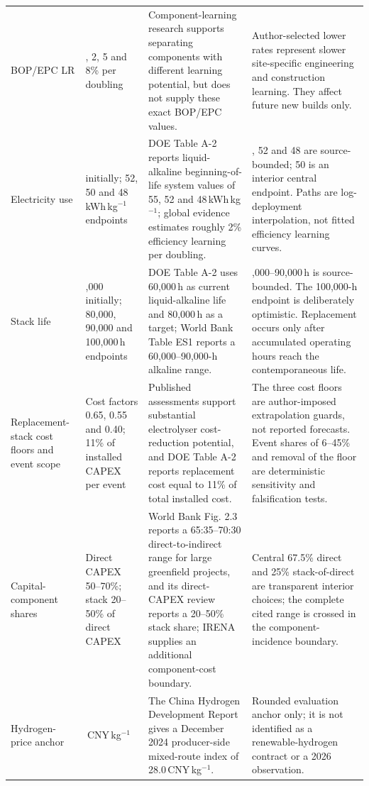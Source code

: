 \documentclass[pdflatex,sn-nature]{sn-jnl}
\begin{document}
\begin{longtable}{>{\raggedright\arraybackslash}p{}>{\raggedright\arraybackslash}p{}>{\raggedright\arraybackslash}p{}>{\raggedright\arraybackslash}p{}}
BOP/EPC LR & 0, 2, 5 and 8\% per doubling & Component-learning research supports separating components with different learning potential, but does not supply these exact BOP/EPC values\cite{ferioli2009}. & Author-selected lower rates represent slower site-specific engineering and construction learning. They affect future new builds only. \\
Electricity use & 55 initially; 52, 50 and 48\,kWh\,kg$^{-1}$ endpoints & DOE Table A-2 reports liquid-alkaline beginning-of-life system values of 55, 52 and 48\,kWh\,kg$^{-1}$; global evidence estimates roughly 2\% efficiency learning per doubling\cite{doe2024,glenk2023}. & 55, 52 and 48 are source-bounded; 50 is an interior central endpoint. Paths are log-deployment interpolation, not fitted efficiency learning curves. \\
Stack life & 60,000 initially; 80,000, 90,000 and 100,000\,h endpoints & DOE Table A-2 uses 60,000\,h as current liquid-alkaline life and 80,000\,h as a target; World Bank Table ES1 reports a 60,000--90,000-h alkaline range\cite{doe2024,worldbank2026}. & 60,000--90,000\,h is source-bounded. The 100,000-h endpoint is deliberately optimistic. Replacement occurs only after accumulated operating hours reach the contemporaneous life. \\
Replacement-stack cost floors and event scope & Cost factors 0.65, 0.55 and 0.40; 11\% of installed CAPEX per event & Published assessments support substantial electrolyser cost-reduction potential, and DOE Table A-2 reports replacement cost equal to 11\% of total installed cost\cite{irena2020,doe2024}. & The three cost floors are author-imposed extrapolation guards, not reported forecasts. Event shares of 6--45\% and removal of the floor are deterministic sensitivity and falsification tests. \\
Capital-component shares & Direct CAPEX 50--70\%; stack 20--50\% of direct CAPEX & World Bank Fig. 2.3 reports a 65:35--70:30 direct-to-indirect range for large greenfield projects, and its direct-CAPEX review reports a 20--50\% stack share; IRENA supplies an additional component-cost boundary\cite{worldbank2026,irena2020}. & Central 67.5\% direct and 25\% stack-of-direct are transparent interior choices; the complete cited range is crossed in the component-incidence boundary. \\
Hydrogen-price anchor & 28\,CNY\,kg$^{-1}$ & The China Hydrogen Development Report gives a December 2024 producer-side mixed-route index of 28.0\,CNY\,kg$^{-1}$\cite{nea2025hydrogen}. & Rounded evaluation anchor only; it is not identified as a renewable-hydrogen contract or a 2026 observation. \\

\end{longtable}
\end{document}
